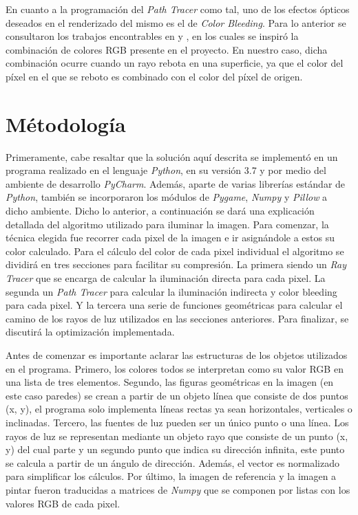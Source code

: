 \documentclass[conference]{IEEEtran}
\begin{document}
En cuanto a la programación del \textit{Path Tracer} como tal, uno de los efectos ópticos deseados en el renderizado del mismo es el de \textit{Color Bleeding}. Para lo anterior se consultaron los trabajos encontrables en \cite{b4} y \cite{b5}, en los cuales se inspiró la combinación de colores RGB presente en el proyecto. En nuestro caso, dicha combinación ocurre cuando un rayo rebota en una superficie, ya que el color del píxel en el que se reboto es combinado con el color del píxel de origen.

\section{Métodología}
Primeramente, cabe resaltar que la solución aquí descrita se implementó en un programa realizado en el lenguaje \textit{Python}, en su versión 3.7 y por medio del ambiente de desarrollo \textit{PyCharm}. Además, aparte de varias librerías estándar de \textit{Python}, también se incorporaron los módulos de \textit{Pygame}, \textit{Numpy} y \textit{Pillow} a dicho ambiente. Dicho lo anterior, a continuación se dará una explicación detallada del algoritmo utilizado para iluminar la imagen. Para comenzar, la técnica elegida fue recorrer cada pixel de la imagen e ir asignándole a estos su color calculado. Para el cálculo del color de cada pixel individual el algoritmo se dividirá en tres secciones para facilitar su compresión. La primera siendo un \textit{Ray Tracer} que se encarga de calcular la iluminación directa para cada pixel. La segunda un \textit{Path Tracer} para calcular la iluminación indirecta y color bleeding para cada pixel. Y la tercera una serie de funciones geométricas para calcular el camino de los rayos de luz utilizados en las secciones anteriores. Para finalizar, se discutirá la optimización implementada. 

Antes de comenzar es importante aclarar las estructuras de los objetos utilizados en el programa. Primero, los colores todos se interpretan como su valor RGB en una lista de tres elementos. Segundo, las figuras geométricas en la imagen (en este caso paredes) se crean a partir de un objeto línea que consiste de dos puntos (x, y), el programa solo implementa líneas rectas ya sean horizontales, verticales o inclinadas. Tercero, las fuentes de luz pueden ser un único punto o una línea. Los rayos de luz se representan mediante un objeto rayo que consiste de un punto (x, y) del cual parte y un segundo punto que indica su dirección infinita, este punto se calcula a partir de un ángulo de dirección. Además, el vector es normalizado para simplificar los cálculos. Por último, la imagen de referencia y la imagen a pintar fueron traducidas a matrices de \textit{Numpy} que se componen por listas con los valores RGB de cada pixel. 
\end{document}
